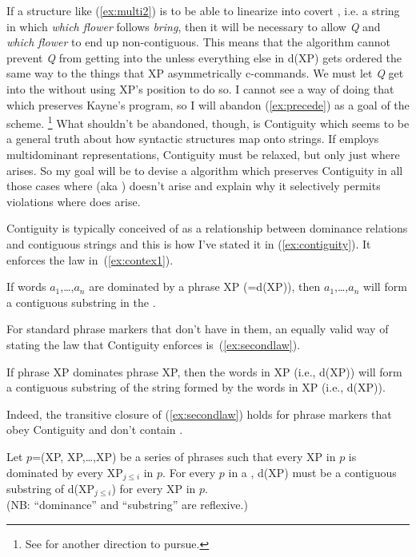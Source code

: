 \documentclass[output=paper]{langsci/langscibook}
\begin{document}
If a structure like (\ref{ex:multi2}) is to be able to linearize into covert , i.e. a string in which \emph{which flower} follows \emph{bring}, then it will be necessary to allow \emph{Q} and \emph{which flower} to end up non-contiguous. This means that the  algorithm cannot prevent \emph{Q} from getting into the  unless everything else in d(XP) gets ordered the same way to the things that XP asymmetrically c-commands. We must let \emph{Q} get into the  without using XP's position to do so. I cannot see a way of doing that which preserves Kayne's program, so I will abandon (\ref{ex:precede}) as a goal of the  scheme.%
\footnote{See \cite{AbeNee2012} for another direction to pursue.} %
What shouldn't be abandoned, though, is Contiguity which seems to be a general truth about how syntactic structures map onto strings. If  employs multidominant representations, Contiguity must be relaxed, but only just where  arises. So my goal will be to devise a  algorithm which preserves Contiguity in all those cases where  (aka ) doesn't arise and explain why it selectively permits violations where  does arise.

Contiguity is typically conceived of as a relationship between dominance relations and contiguous strings and this is how I've stated it in (\ref{ex:contiguity}). It enforces the law in~(\ref{ex:contex1}).
\begin{exe}
	\ex \label{ex:contex1}
	If words $a_1$,\ldots,$a_n$ are dominated by a phrase XP (=d(XP)), then $a_1$,\ldots,$a_n$ will form a contiguous substring in the .
\end{exe}

For standard phrase markers that don't have  in them, an equally valid way of stating the law that Contiguity enforces is~(\ref{ex:secondlaw}).
\begin{exe}
	\ex \label{ex:secondlaw}
	If phrase XP dominates phrase XP, then the words in XP (i.e., d(XP)) will form a contiguous substring of the string formed by the words in XP (i.e., d(XP)).
\end{exe}

Indeed, the transitive closure of (\ref{ex:secondlaw}) holds for phrase markers that obey Contiguity and don't contain .
\begin{exe}
	\ex \label{ex:thirdlaw}
	Let $p$=(XP, XP,\ldots,XP) be a series of phrases such that every XP in $p$ is dominated by every XP$_{j \leq i}$ in $p$. For every $p$ in a , d(XP) must be a contiguous substring of d(XP$_{j \leq i}$) for every XP in $p$.\\[8pt]
	(NB: ``dominance'' and ``substring'' are reflexive.)
\end{exe}
\end{document}
